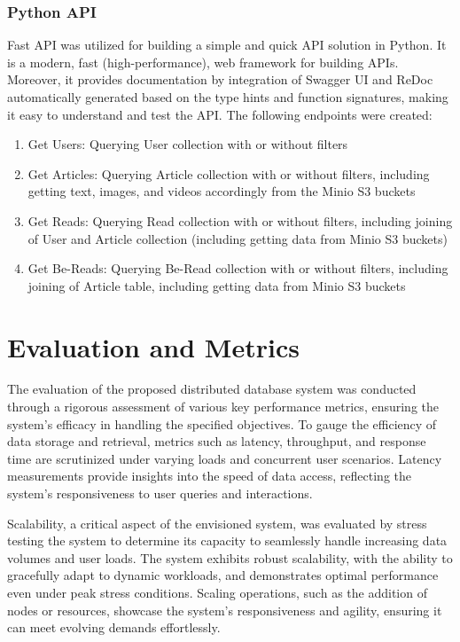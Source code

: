 \documentclass{article}
\begin{document}
    \subsubsection{Python API}
    Fast API was utilized for building a simple and quick API solution in Python. It is a modern, fast (high-performance), web framework for building APIs. Moreover, it provides documentation by integration of Swagger UI and ReDoc automatically generated based on the type hints and function signatures, making it easy to understand and test the API.
    The following endpoints were created:
    \begin{enumerate}
        \item Get Users: Querying User collection with or without filters
        \item Get Articles: Querying Article collection with or without filters, including getting text, images, and videos accordingly from the Minio S3 buckets
        \item Get Reads: Querying Read collection with or without filters, including joining of User and Article collection (including getting data from Minio S3 buckets)
        \item Get Be-Reads: Querying Be-Read collection with or without filters, including joining of Article table, including getting data from Minio S3 buckets
    \end{enumerate}

    \section{Evaluation and Metrics}
    The evaluation of the proposed distributed database system was conducted through a rigorous assessment of various key performance metrics, ensuring the system's efficacy in handling the specified objectives. To gauge the efficiency of data storage and retrieval, metrics such as latency, throughput, and response time are scrutinized under varying loads and concurrent user scenarios. Latency measurements provide insights into the speed of data access, reflecting the system's responsiveness to user queries and interactions.
    
    Scalability, a critical aspect of the envisioned system, was evaluated by stress testing the system to determine its capacity to seamlessly handle increasing data volumes and user loads. The system exhibits robust scalability, with the ability to gracefully adapt to dynamic workloads, and demonstrates optimal performance even under peak stress conditions. Scaling operations, such as the addition of nodes or resources, showcase the system's responsiveness and agility, ensuring it can meet evolving demands effortlessly.
    
\end{document}
